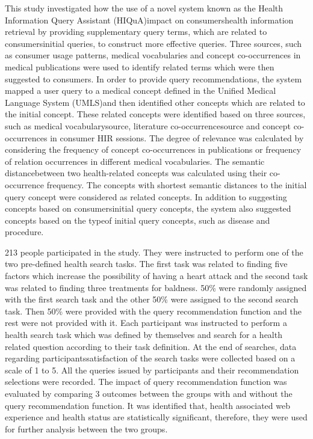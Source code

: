 \documentclass[]{article}
\begin{document}
\begin{enumerate}
This study investigated how the use of a novel system known as \textquotesingle the  Health Information Query Assistant (HIQuA)\textquotesingle  impact on consumers\textquotesingle health information retrieval by providing supplementary query terms, which are related to consumers\textquotesingle  initial queries, to construct more effective queries. Three sources, such as consumer usage patterns, medical vocabularies and concept co-occurrences in medical publications were used to identify related terms which were then suggested to consumers. In order to provide query recommendations, the system mapped a user query to a medical concept defined in the \textquotesingle Unified Medical Language System (UMLS)\textquotesingle  and then identified other concepts which are related to the initial concept. These related concepts were identified based on three sources, such as \textquotesingle medical vocabulary\textquotesingle  source, \textquotesingle literature co-occurrence\textquotesingle source and \textquotesingle concept co-occurrences in consumer HIR sessions\textquotesingle. The degree of relevance was calculated by considering the frequency of concept co-occurrences in publications or frequency of relation occurrences in different medical vocabularies. The \textquotesingle semantic distance\textquotesingle between two health-related concepts was calculated using their co-occurrence frequency. The concepts with shortest semantic distances to the initial query concept were considered as related concepts. In addition to suggesting concepts based on consumers\textquotesingle  initial query concepts, the system also suggested concepts based on the \textquotesingle type\textquotesingle of initial query concepts, such as disease and procedure.      

213 people participated in the study. They were instructed to perform one of the two pre-defined health search tasks. The first task was related to finding five factors which increase the possibility of having a heart attack and the second task was related to finding three treatments for baldness. 50\% were randomly assigned with the first search task and the other 50\% were assigned to the second search task. Then 50\% were provided with the query recommendation function and the rest were not provided with it. Each participant was instructed to perform a health search task which was defined by themselves and search for a health related question according to their task definition. At the end of searches, data regarding participants\textquotesingle  satisfaction of the search tasks were collected based on a scale of 1 to 5. All the queries issued by participants and their recommendation selections were recorded. The impact of query recommendation function was evaluated by comparing 3 outcomes between the groups with and without the query recommendation function. It was identified that, health associated web experience and health status are statistically significant, therefore, they were used for further analysis between the two groups.


\end{enumerate}
\end{document}
